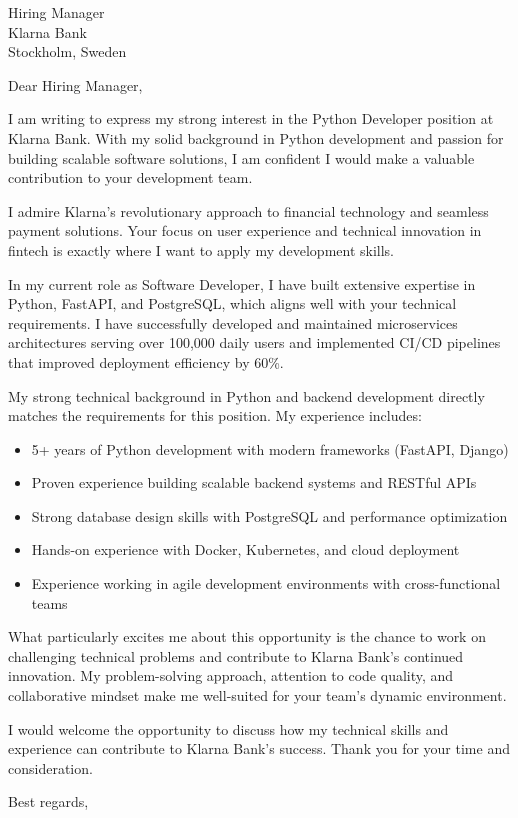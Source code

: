 \documentclass[11pt,a4paper]{letter}
\begin{document}
\begin{letter}{Hiring Manager \\ Klarna Bank \\ Stockholm, Sweden}

\opening{Dear Hiring Manager,}

I am writing to express my strong interest in the Python Developer position at Klarna Bank. With my solid background in Python development and passion for building scalable software solutions, I am confident I would make a valuable contribution to your development team.

I admire Klarna's revolutionary approach to financial technology and seamless payment solutions. Your focus on user experience and technical innovation in fintech is exactly where I want to apply my development skills.

In my current role as Software Developer, I have built extensive expertise in Python, FastAPI, and PostgreSQL, which aligns well with your technical requirements. I have successfully developed and maintained microservices architectures serving over 100,000 daily users and implemented CI/CD pipelines that improved deployment efficiency by 60\%.

My strong technical background in Python and backend development directly matches the requirements for this position. My experience includes:

\begin{itemize}
\item 5+ years of Python development with modern frameworks (FastAPI, Django)
\item Proven experience building scalable backend systems and RESTful APIs
\item Strong database design skills with PostgreSQL and performance optimization
\item Hands-on experience with Docker, Kubernetes, and cloud deployment
\item Experience working in agile development environments with cross-functional teams
\end{itemize}

What particularly excites me about this opportunity is the chance to work on challenging technical problems and contribute to Klarna Bank's continued innovation. My problem-solving approach, attention to code quality, and collaborative mindset make me well-suited for your team's dynamic environment.

I would welcome the opportunity to discuss how my technical skills and experience can contribute to Klarna Bank's success. Thank you for your time and consideration.

\closing{Best regards,}

\end{letter}
\end{document}
